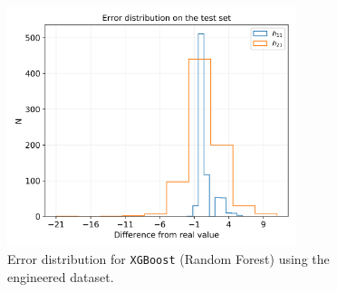     \begin{figure}[t]
        \centering
        \includegraphics[width=0.75\textwidth]{tex/img/xgbrf_error_eng.png}
        \caption{Error distribution for \texttt{XGBoost} (Random Forest) using the engineered dataset.}
        \label{fig:xgbrf_err}
    \end{figure}